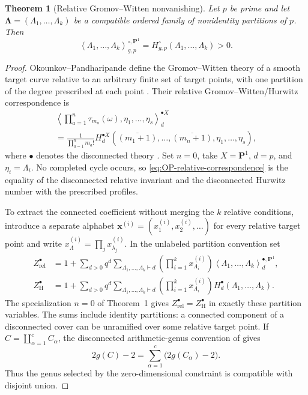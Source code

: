 \documentclass[10pt,a4paper]{amsart}
\newtheorem{theorem}{Theorem}[section]
\numberwithin{equation}{section}
\begin{document}
\begin{theorem}[Relative Gromov--Witten nonvanishing]
\label{thm:relative-GW-nonvanishing}
Let $p$ be prime and let
$\boldsymbol\Lambda=(\Lambda_1,\ldots,\Lambda_k)$ be a compatible ordered
family of nonidentity partitions of $p$.  Then
\begin{equation}\label{eq:relative-GW-equals-Hurwitz}
 \left\langle\Lambda_1,\ldots,\Lambda_k
 \right\rangle^{\circ,\mathbf P^1}_{g,p}
 =H^\circ_{g,p}(\Lambda_1,\ldots,\Lambda_k)>0.
\end{equation}
\end{theorem}

\begin{proof}
Okounkov--Pandharipande define the Gromov--Witten theory of a smooth target
curve relative to an arbitrary finite set of target points, with one
partition of the degree prescribed at each point
\cite[Section~1.2]{OkounkovPandharipande}.  Their relative
Gromov--Witten/Hurwitz correspondence is
\begin{multline}\label{eq:OP-relative-correspondence}
 \left\langle
   \prod_{a=1}^{n}\tau_{m_a}(\omega),
   \eta_1,\ldots,\eta_s
 \right\rangle^{\bullet X}_{d}\\
 =\frac1{\prod_{a=1}^{n}m_a!}
 H^{\bullet X}_{d}
 \left(\overline{(m_1+1)},\ldots,\overline{(m_n+1)},
       \eta_1,\ldots,\eta_s\right),
\end{multline}
where $\bullet$ denotes the disconnected theory
\cite[Theorem~1]{OkounkovPandharipande}.  Set $n=0$, take
$X=\mathbf P^1$, $d=p$, and $\eta_i=\Lambda_i$.  No completed cycle occurs,
so \eqref{eq:OP-relative-correspondence} is the equality of the
disconnected relative invariant and the disconnected Hurwitz number with
the prescribed profiles.

To extract the connected coefficient without merging the $k$ relative
conditions, introduce a separate alphabet
$\mathbf x^{(i)}=(x^{(i)}_1,x^{(i)}_2,\ldots)$ for every relative target
point and write $x^{(i)}_\Lambda=\prod_jx^{(i)}_{\lambda_j}$.  In the
unlabeled partition convention set
\begin{align*}
 Z^\bullet_{\mathrm{rel}}
 &=1+\sum_{d>0}q^d
   \sum_{\Lambda_1,\ldots,\Lambda_k\vdash d}
   \left(\prod_{i=1}^k x^{(i)}_{\Lambda_i}\right)
   \left\langle\Lambda_1,\ldots,\Lambda_k
   \right\rangle^{\bullet,\mathbf P^1}_{d},\\
 Z^\bullet_{\mathrm H}
 &=1+\sum_{d>0}q^d
   \sum_{\Lambda_1,\ldots,\Lambda_k\vdash d}
   \left(\prod_{i=1}^k x^{(i)}_{\Lambda_i}\right)
   H^\bullet_d(\Lambda_1,\ldots,\Lambda_k).
\end{align*}
The specialization $n=0$ of Theorem~1 gives
$Z^\bullet_{\mathrm{rel}}=Z^\bullet_{\mathrm H}$ in exactly these
partition variables.  The sums include identity partitions: a connected
component of a disconnected cover can be unramified over some relative
target point.  If $C=\coprod_{\alpha=1}^cC_\alpha$, the disconnected
arithmetic-genus convention of
\cite[Section~0.2]{OkounkovPandharipande} gives
\[
 2g(C)-2=\sum_{\alpha=1}^c\bigl(2g(C_\alpha)-2\bigr).
\]
Thus the genus selected by the zero-dimensional constraint is compatible
with disjoint union.


\end{proof}
\end{document}
